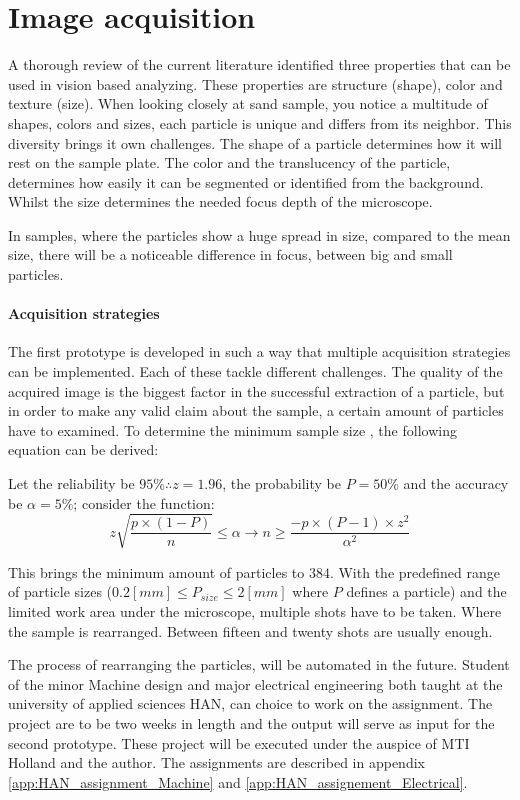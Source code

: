 \documentclass[11pt,fleqn,,a4paper,twoside,openright]{book}
\begin{document}
\section{Image acquisition}
A thorough review of the current literature \cite{Spijker14a} identified three properties that can be used in vision based analyzing. These properties are structure  (shape), color and texture  (size). When looking closely at sand sample, you notice a multitude of shapes, colors and sizes, each particle is unique and differs from its neighbor. This diversity brings it own challenges. The shape of a particle determines how it will rest on the sample plate. The color and the translucency of the particle, determines how easily it can be segmented or identified from the background. Whilst the size determines the needed focus depth of the microscope.
\begin{remark}
	In samples, where the particles show a huge spread in size, compared to the mean size, there will be a noticeable difference in focus, between big and small particles.
\end{remark}

\paragraph{Acquisition strategies}The first prototype is developed in such a way that multiple acquisition strategies can be implemented. Each of these tackle different challenges. The quality of the acquired image is the biggest factor in the successful extraction of a particle, but in order to make any valid claim about the sample, a certain amount of particles have to examined. To determine the minimum sample size , the following equation can be derived:
\begin{sBox}
	Let the reliability be $95\% \therefore z=1.96$, the probability be $P=50\%$ and the accuracy be $\alpha=5\%$; consider the function:
	\begin{equation}
	z\sqrt{\frac{p\times(1-P)}{n}}\leq\alpha \rightarrow n\geq\frac{-p\times(P-1)\times z^2}{\alpha^2}
	\end{equation}
\end{sBox}
This brings the minimum amount of particles to $384$. With the predefined range of particle sizes ($0.2[mm]\leq P_{size} \leq 2[mm]$ where $P$ defines a particle) and the limited work area under the microscope, multiple shots have to be taken. Where the sample is rearranged. Between fifteen and twenty shots are usually enough.
\begin{remark}
	 The process of rearranging the particles, will be automated in the future. Student of the minor Machine design and major electrical engineering both taught at the university of applied sciences HAN, can choice to work on the assignment. The project are to be two weeks in length and the output will serve as input for the second prototype. These project will be executed under the auspice of MTI Holland and the author. The assignments are described in appendix \ref{app:HAN_assignment_Machine} and \ref{app:HAN_assignement_Electrical}.
\end{remark}
\end{document}
